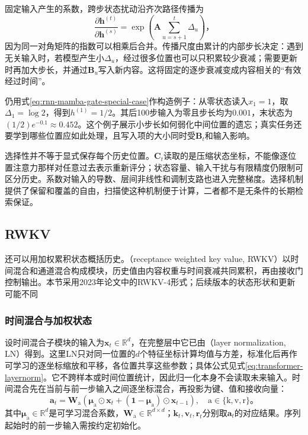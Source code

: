 固定输入产生的系数，跨步状态扰动沿齐次路径传播为
\begin{equation}
  \frac{\partial\bm h^{(t)}}{\partial\bm h^{(s)}}
    =\exp\!\left(\bm A\sum_{u=s+1}^{t}\Delta_u\right)\text{，}
  \label{eq:rnn-mamba-memory-product}
\end{equation}
因为同一对角矩阵的指数可以相乘后合并。传播尺度由累计的内部步长决定：遇到无关输入时，若模型产生小$\Delta_u$，经过很多位置也可以只积累较少衰减；需要更新时再加大步长，并通过$\bm B_u$写入新内容。这将固定的逐步衰减变成内容相关的“有效经过时间”。

仍用式\eqref{eq:rnn-mamba-gate-special-case}作构造例子：从零状态读入$x_1=1$，取$\Delta_1=\log2$，得到$h^{(1)}=1/2$。其后100步输入为零且步长均为$0.001$，末状态为$(1/2)e^{-0.1}\approx0.452$。这个例子展示小步长如何弱化中间位置的遗忘；真实任务还要学到哪些位置应如此处理，且写入项的大小同时受$\bm B_t$和输入影响。

选择性并不等于显式保存每个历史位置。$\bm C_t$读取的是压缩状态坐标，不能像逐位置注意力那样对任意过去表示重新评分；状态容量、输入干扰与有限精度仍限制可区分历史。系数对输入的导数、层间非线性和调制支路也进入完整梯度。选择机制提供了保留和覆盖的自由，扫描使这种机制便于计算，二者都不是无条件的长期检索保证。

\Needspace{105mm}
\subsection{RWKV}
\label{sec:rnn-rwkv}

还可以用加权累积状态概括历史。（receptance weighted key value, RWKV）以时间混合和通道混合构成模块，历史值由内容权重与时间衰减共同累积，再由接收门控制输出。本节采用2023年论文中的RWKV-4形式；后续版本的状态形状和更新可能不同

\subsubsection{时间混合与加权状态}
\label{sec:rnn-rwkv-time-mixing}

设时间混合子模块的输入为$\bm{x}_t\in\mathbb{R}^{d}$，在完整层中它已由（layer normalization, LN）得到。这里LN只对同一位置的$d$个特征坐标计算均值与方差，标准化后再作可学习的逐坐标缩放和平移，各位置共享这些参数；具体公式见式\eqref{eq:transformer-layernorm}。它不跨样本或时间位置统计，因此归一化本身不会读取未来输入。时间混合先在当前与前一步输入之间逐坐标混合，再投影为键、值和接收向量：
\begin{equation}
  \bm{a}_t=\bm{W}_{\mathrm{a}}\!\left(
    \bm{\mu}_{\mathrm{a}}\odot\bm{x}_t
    +(\bm{1}-\bm{\mu}_{\mathrm{a}})\odot\bm{x}_{t-1}\right),
  \quad \mathrm{a}\in\{\mathrm{k},\mathrm{v},\mathrm{r}\}\text{。}
  \label{eq:rnn-rwkv-time-mixing}
\end{equation}
其中$\bm{\mu}_{\mathrm{a}}\in\mathbb{R}^{d}$是可学习混合系数，$\bm{W}_{\mathrm{a}}\in\mathbb{R}^{d\times d}$；$\bm{k}_t,\bm{v}_t,\bm{r}_t$分别取$\bm{a}_t$的对应结果。序列起始时的前一步输入需按约定初始化。

